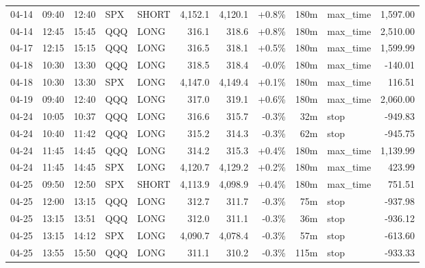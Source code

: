 \documentclass[11pt,a4paper,twoside]{article}
\begin{document}
\begin{center}
\begin{longtable}{>{\color{txtmain}}l l l l l r r r r >{\color{txtmain}}l r}
04-14 & 09:40 & 12:40 & SPX & SHORT & 4,152.1 & 4,120.1 & \textcolor{wingreen}{+0.8\%} & 180m & max\_time & \textcolor{wingreen}{1,597.00} \\
04-14 & 12:45 & 15:45 & QQQ & LONG & 316.1 & 318.6 & \textcolor{wingreen}{+0.8\%} & 180m & max\_time & \textcolor{wingreen}{2,510.00} \\
04-17 & 12:15 & 15:15 & QQQ & LONG & 316.5 & 318.1 & \textcolor{wingreen}{+0.5\%} & 180m & max\_time & \textcolor{wingreen}{1,599.99} \\
04-18 & 10:30 & 13:30 & QQQ & LONG & 318.5 & 318.4 & \textcolor{lossred}{-0.0\%} & 180m & max\_time & \textcolor{lossred}{-140.01} \\
04-18 & 10:30 & 13:30 & SPX & LONG & 4,147.0 & 4,149.4 & \textcolor{wingreen}{+0.1\%} & 180m & max\_time & \textcolor{wingreen}{116.51} \\
04-19 & 09:40 & 12:40 & QQQ & LONG & 317.0 & 319.1 & \textcolor{wingreen}{+0.6\%} & 180m & max\_time & \textcolor{wingreen}{2,060.00} \\
04-24 & 10:05 & 10:37 & QQQ & LONG & 316.6 & 315.7 & \textcolor{lossred}{-0.3\%} & 32m & stop & \textcolor{lossred}{-949.83} \\
04-24 & 10:40 & 11:42 & QQQ & LONG & 315.2 & 314.3 & \textcolor{lossred}{-0.3\%} & 62m & stop & \textcolor{lossred}{-945.75} \\
04-24 & 11:45 & 14:45 & QQQ & LONG & 314.2 & 315.3 & \textcolor{wingreen}{+0.4\%} & 180m & max\_time & \textcolor{wingreen}{1,139.99} \\
04-24 & 11:45 & 14:45 & SPX & LONG & 4,120.7 & 4,129.2 & \textcolor{wingreen}{+0.2\%} & 180m & max\_time & \textcolor{wingreen}{423.99} \\
04-25 & 09:50 & 12:50 & SPX & SHORT & 4,113.9 & 4,098.9 & \textcolor{wingreen}{+0.4\%} & 180m & max\_time & \textcolor{wingreen}{751.51} \\
04-25 & 12:00 & 13:15 & QQQ & LONG & 312.7 & 311.7 & \textcolor{lossred}{-0.3\%} & 75m & stop & \textcolor{lossred}{-937.98} \\
04-25 & 13:15 & 13:51 & QQQ & LONG & 312.0 & 311.1 & \textcolor{lossred}{-0.3\%} & 36m & stop & \textcolor{lossred}{-936.12} \\
04-25 & 13:15 & 14:12 & SPX & LONG & 4,090.7 & 4,078.4 & \textcolor{lossred}{-0.3\%} & 57m & stop & \textcolor{lossred}{-613.60} \\
04-25 & 13:55 & 15:50 & QQQ & LONG & 311.1 & 310.2 & \textcolor{lossred}{-0.3\%} & 115m & stop & \textcolor{lossred}{-933.33} \\

\end{longtable}
\end{center}
\end{document}
